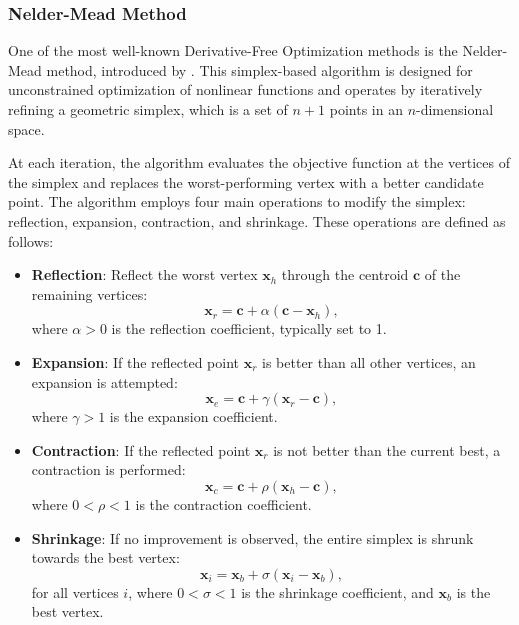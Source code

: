 \subsubsection{Nelder-Mead Method}
\label{subsubsection:nelder_mead}
One of the most well-known Derivative-Free Optimization methods is the Nelder-Mead method, introduced by \citet{nelder1965simplex}. This simplex-based algorithm is designed for unconstrained optimization of nonlinear functions and operates by iteratively refining a geometric simplex, which is a set of \(n+1\) points in an \(n\)-dimensional space.

At each iteration, the algorithm evaluates the objective function at the vertices of the simplex and replaces the worst-performing vertex with a better candidate point. The algorithm employs four main operations to modify the simplex: reflection, expansion, contraction, and shrinkage. These operations are defined as follows:

\begin{itemize}
    \item \textbf{Reflection}: Reflect the worst vertex \(\mathbf{x}_h\) through the centroid \(\mathbf{c}\) of the remaining vertices:
    \begin{equation*}
    \mathbf{x}_r = \mathbf{c} + \alpha (\mathbf{c} - \mathbf{x}_h),
    \end{equation*}
    where \(\alpha > 0\) is the reflection coefficient, typically set to 1.

\item \textbf{Expansion}: If the reflected point \(\mathbf{x}_r\) is better than all other vertices, an expansion is attempted:
\begin{equation*}
\mathbf{x}_e = \mathbf{c} + \gamma (\mathbf{x}_r - \mathbf{c}),
\end{equation*}
where \(\gamma > 1\) is the expansion coefficient.

\item \textbf{Contraction}: If the reflected point \(\mathbf{x}_r\) is not better than the current best, a contraction is performed:
\begin{equation*}
\mathbf{x}_c = \mathbf{c} + \rho (\mathbf{x}_h - \mathbf{c}),
\end{equation*}
where \(0 < \rho < 1\) is the contraction coefficient.

\item \textbf{Shrinkage}: If no improvement is observed, the entire simplex is shrunk towards the best vertex:
\begin{equation*}
\mathbf{x}_i = \mathbf{x}_b + \sigma (\mathbf{x}_i - \mathbf{x}_b),
\end{equation*}
for all vertices \(i\), where \(0 < \sigma < 1\) is the shrinkage coefficient, and \(\mathbf{x}_b\) is the best vertex.
\end{itemize}


